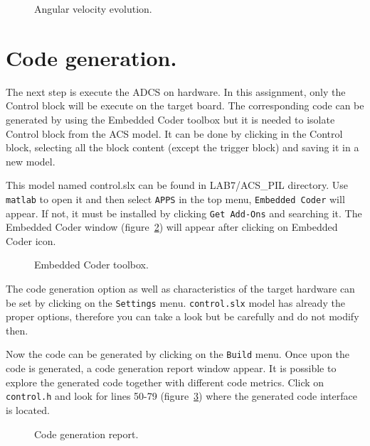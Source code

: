 \begin{figure}[h]
            \caption{Angular velocity evolution.}

            \label{fig:scope}
\end{figure}

\section{Code generation.}

The next step is execute the ADCS on hardware. In this assignment, only the Control block will be execute on the target board.
The corresponding code can be generated by using the Embedded Coder toolbox but it is needed to isolate Control block from the ACS model. It can be done by clicking in the Control block, selecting all the block content (except the trigger block) and saving it in a new model. 

This model named control.slx can be found in LAB7/ACS\_PIL directory. Use {\tt matlab} to open it and then select {\tt APPS} in the top menu, {\tt Embedded Coder} will appear. If not, it must be installed by clicking {\tt Get Add-Ons} and searching it. The Embedded Coder window (figure~\ref{fig:control}) will appear after clicking on Embedded Coder icon.

\begin{figure}[h]
            \caption{Embedded Coder toolbox.}

            \label{fig:control}
\end{figure}

The code generation option as well as characteristics of the target hardware can be set by clicking on the {\tt Settings} menu. {\tt control.slx} model has already the proper options, therefore you can take a look but be carefully and do not modify then.

Now the code can be generated by clicking on the {\tt Build} menu. Once upon the code is generated, a code generation report window appear. It is possible to explore the generated code together with different code metrics. Click on {\tt control.h} and look for lines 50-79 (figure~\ref{fig:code}) where the generated code interface is located.

\begin{figure}[h]
            \caption{Code generation report.}

            \label{fig:code}
\end{figure}

